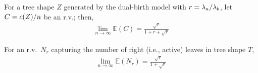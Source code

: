 \begin{theorem}\label{sup:thm:cherr}
For a tree shape $Z$ generated by the dual-birth model with $r=\lambda_a/\lambda_b$, let $C=c(Z)/n$ be an r.v.; then, 
\begin{align}\label{sup:eq:cherries}
\lim_{n\to\infty}\mathbb{E}(C) = \frac{\sqrt{r}}{1+r+\sqrt{r}}
\end{align}
\end{theorem}

\begin{corollary}\label{sup:cor:rbh}
For an r.v.\ $N_r$ capturing the number of right (i.e., active) leaves in tree shape $T$,
\begin{align}\label{sup:eq:nr}
\lim_{n\to\infty}\mathbb{E}(N_r) = \frac{\sqrt{r}}{1+\sqrt{r}}
\end{align}
\end{corollary}

